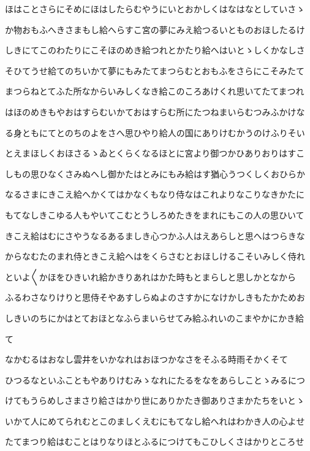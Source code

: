 \documentclass[a4paper,11pt,landscape]{ltjtarticle}
\begin{document}
ほはことさらにそめにほはしたらむやうにいとおかしくはなはなとしていさゝ
\par\medskip
か物おもふへきさまもし給へらすこ宮の夢にみえ給つるいとものおほしたるけ
\par\medskip
しきにてこのわたりにこそほのめき給つれとかたり給へはいとゝしくかなしさ
\par\medskip
そひてうせ給てのちいかて夢にもみたてまつらむとおもふをさらにこそみたて
\par\medskip
まつらねとてふた所なからいみしくなき給このころあけくれ思いてたてまつれ
\par\medskip
はほのめきもやおはすらむいかておはすらむ所にたつねまいらむつみふかけな
\par\medskip
る身ともにてとのちのよをさへ思ひやり給人の国にありけむかうのけふりそい
\par\medskip
とえまほしくおほさるゝゐとくらくなるほとに宮より御つかひありおりはすこ
\par\medskip
しもの思ひなくさみぬへし御かたはとみにもみ給はす猶心うつくしくおひらか
\par\medskip
なるさまにきこえ給へかくてはかなくもなり侍なはこれよりなこりなきかたに
\par\medskip
もてなしきこゆる人もやいてこむとうしろめたきをまれにもこの人の思ひいて
\par\medskip
きこえ給はむにさやうなるあるましき心つかふ人はえあらしと思へはつらきな
\par\medskip
からなむたのまれ侍ときこえ給へはをくらさむとおほしけるこそいみしく侍れ
\par\medskip
といよ〱かほをひきいれ給かきりあれはかた時もとまらしと思しかとなから
\par\medskip
ふるわさなりけりと思侍そやあすしらぬよのさすかになけかしきもたかためお
\par\medskip
しきいのちにかはとておほとなふらまいらせてみ給ふれいのこまやかにかき給
\par\medskip
て
\par\medskip
なかむるはおなし雲井をいかなれはおほつかなさをそふる時雨そかくそて
\par\medskip
ひつるなといふこともやありけむみゝなれにたるをなをあらしことゝみるにつ
\par\medskip
けてもうらめしさまさり給さはかり世にありかたき御ありさまかたちをいとゝ
\par\medskip
いかて人にめてられむとこのましくえむにもてなし給へれはわかき人の心よせ
\par\medskip
たてまつり給はむことはりなりほとふるにつけてもこひしくさはかりところせ
\end{document}
